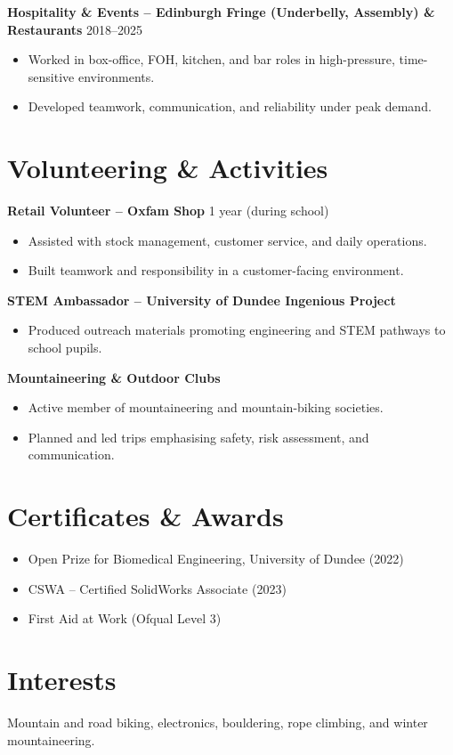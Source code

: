 \documentclass[a4paper,11pt]{article}
\begin{document}
\textbf{Hospitality \& Events – Edinburgh Fringe (Underbelly, Assembly) \& Restaurants} \hfill 2018--2025
\begin{itemize}
    \item Worked in box-office, FOH, kitchen, and bar roles in high-pressure, time-sensitive environments.
    \item Developed teamwork, communication, and reliability under peak demand.
\end{itemize}

\section*{Volunteering \& Activities}

\textbf{Retail Volunteer – Oxfam Shop} \hfill 1 year (during school)
\begin{itemize}
    \item Assisted with stock management, customer service, and daily operations.
    \item Built teamwork and responsibility in a customer-facing environment.
\end{itemize}

\textbf{STEM Ambassador – University of Dundee Ingenious Project}
\begin{itemize}
    \item Produced outreach materials promoting engineering and STEM pathways to school pupils.
\end{itemize}

\textbf{Mountaineering \& Outdoor Clubs}
\begin{itemize}
    \item Active member of mountaineering and mountain-biking societies.
    \item Planned and led trips emphasising safety, risk assessment, and communication.
\end{itemize}

\section*{Certificates \& Awards}
\begin{itemize}
    \item Open Prize for Biomedical Engineering, University of Dundee (2022)
    \item CSWA – Certified SolidWorks Associate (2023)
    \item First Aid at Work (Ofqual Level 3)
\end{itemize}

\section*{Interests}
Mountain and road biking, electronics, bouldering, rope climbing, and winter mountaineering.
\end{document}
